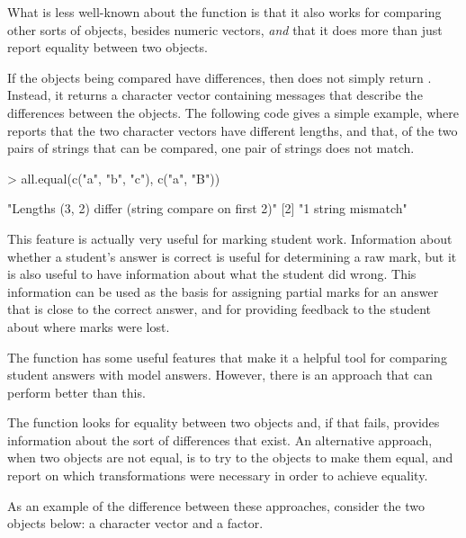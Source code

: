 What is less well-known about the  function
is that it also works for comparing other sorts of \R{} objects,
besides numeric vectors, \emph{and} that it does more than just
report equality between two objects.  

If the objects being compared
have differences, then  does not simply return
.  Instead, it returns a character vector 
containing messages that describe the differences between the objects.
The following code gives a simple example, where 
reports that the two character vectors have different lengths,
and that, of the two pairs of strings that can be compared, one pair
of strings does not match.

\begin{Schunk}
\begin{Sinput}
> all.equal(c("a", "b", "c"), c("a", "B"))
\end{Sinput}
\end{Schunk}
{\footnotesize
\begin{Schunk}
\begin{Soutput}
[1] "Lengths (3, 2) differ (string compare on first 2)"
[2] "1 string mismatch"                                
\end{Soutput}
\end{Schunk}
} %

This feature is actually very useful for marking student work.
Information about whether a student's answer is correct is useful
for determining a raw mark, but it is also useful to have 
information about what the student did wrong.  This information
can be used
as the basis for assigning partial marks for an answer that
is close to the correct answer, and for providing feedback 
to the student about where marks were lost.

The  function has some useful features that
make it a helpful 
tool for comparing student answers with model answers.
However, there is an approach that can perform better than this.

The  function looks for equality between two objects
and, if that fails,
provides information about the sort of differences that exist.
An alternative approach, when two objects are not equal, is to 
try to  the objects to make them equal, and report
on which transformations were necessary in order to achieve equality.

As an example of the difference between these approaches, consider the
two objects below:  a character vector and a factor.

